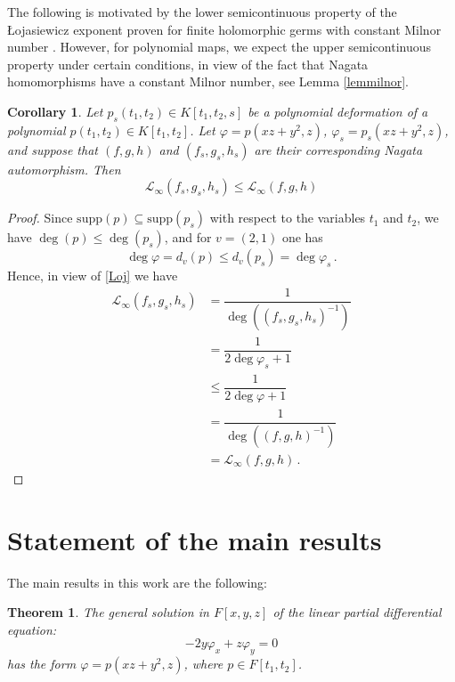 \documentclass{amsart}
\newtheorem{thm}{Theorem}
\newtheorem{cor}{Corollary}
\def\supp {\mathrm{supp}}
\begin{document}
The following is motivated by the lower semicontinuous property of the \L{}ojasiewicz exponent proven for finite holomorphic germs with constant Milnor number \cite[Theorem 2.1]{Plos10}. However, for polynomial maps, we expect the upper semicontinuous property under certain conditions, in view of the fact that Nagata homomorphisms have a constant Milnor number, see Lemma \ref{lemmilnor}.
\begin{cor}
	Let $p_s(t_1,t_2)\in K[t_1,t_2, s]$ be a polynomial deformation of a polynomial $p(t_1,t_2)\in K[t_1,t_2]$. Let $\varphi=p(xz+y^2,z)$, $\varphi_s=p_s(xz+y^2,z)$, and suppose that $(f,g,h)$ and $(f_s,g_s,h_s)$ are their corresponding Nagata automorphism.
	Then 
	$$\mathcal{L}_{\infty}(f_s,g_s, h_s)\leq \mathcal{L}_{\infty}(f,g, h)$$
\end{cor}
\begin{proof}
	Since $\supp(p)\subseteq \supp(p_s)$ with respect to the variables $t_1$ and $t_2$, we have $\deg(p)\leq \deg(p_s)$, and for $v=(2,1)$ one has 
	$$\deg \varphi=d_v(p)\leq d_v(p_s)=\deg \varphi_s\,.$$
	Hence, in view of \eqref{Loj} we have 
	\begin{align*}
		\mathcal{L}_{\infty}(f_s,g_s, h_s)&=\dfrac{1}{\deg ((f_s,g_s, h_s)^{-1})}\\&
		=\dfrac{1}{2\deg \varphi_s+1 }\\&\leq 
		\dfrac{1}{2\deg \varphi+1 }\\&=\dfrac{1}{\deg ((f,g, h)^{-1})}\\&=\mathcal{L}_{\infty}(f,g, h)\,.
	\end{align*}
\end{proof}



\section{Statement of the main results }
The main results in this work are the following:
\begin{thm} \label{Teorpr}
	The general solution in $F[x,y,z]$ of the linear partial differential equation: 
	\begin{equation}\label{eq1}
		-2y\varphi_x+z\varphi_y=0
	\end{equation}
	has the form $
	\varphi=p(xz+y^2,z)$,
	where $p\in F[t_1,t_2]$.
\end{thm}
\end{document}
